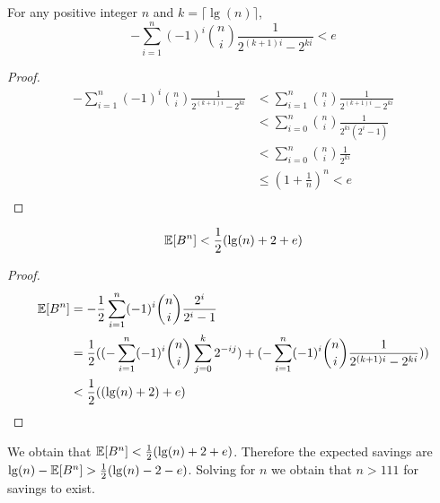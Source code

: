 \begin{lemma}
  For any positive integer $n$ and $k=\lceil \lg(n) \rceil$,
  \[
    -\sum_{i=1}^n (-1)^i {n \choose i} \frac{1}{2^{(k+1)i} - 2^{ki}} < e
  \]
\end{lemma}
\begin{proof}
  \begin{align*}
    -\sum_{i=1}^n (-1)^i {n \choose i} \frac{1}{2^{(k+1)i} - 2^{ki}}
    &< \sum_{i=1}^n {n \choose i} \frac{1}{2^{(k+1)i} - 2^{ki}} \\
    &< \sum_{i=0}^n {n \choose i} \frac{1}{2^{ki}(2^i-1)} \\
    &< \sum_{i=0}^n {n \choose i} \frac{1}{2^{ki}} \\
    &\le (1+\frac{1}{n})^n < e \\
  \end{align*}
\end{proof}

\begin{theorem}
  \[
    \operatorname{\mathbb{E}}[B^n] < \frac{1}{2}(\lg(n)+2+e)
  \]
\end{theorem}
\begin{proof}
  \begin{align*}
    \operatorname{\mathbb{E}}[B^n]
    &= -\frac{1}{2} \sum_{i = 1}^n (-1)^i {n \choose i} \frac{2^i}{2^i - 1} \\
    &= \frac{1}{2}((-\sum_{i=1}^n (-1)^i {n \choose i} \sum_{j=0}^k 2^{-ij}) + (-\sum_{i=1}^n (-1)^i {n \choose i} \frac{1}{2^{(k+1)i} - 2^{ki}})) \\
    &< \frac{1}{2}((\lg(n) + 2) + e)
  \end{align*}
\end{proof}

We obtain that $\operatorname{\mathbb{E}}[B^n] < \frac{1}{2}(\lg(n)+2+e)$. Therefore the expected savings are $\lg(n) - \operatorname{\mathbb{E}}[B^n] > \frac{1}{2}(\lg(n)-2-e)$. Solving for $n$ we obtain that $n > 111$ for savings to exist.

